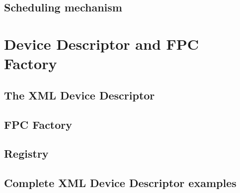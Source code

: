 \subsection{Scheduling mechanism}


\section{Device Descriptor and FPC Factory}

\subsection{The XML Device Descriptor}

\subsection{FPC Factory}

\subsection{Registry}

\subsection{Complete XML Device Descriptor examples}
